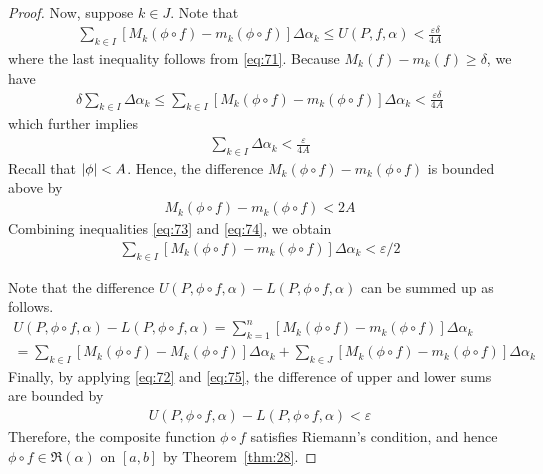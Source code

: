 \documentclass[thmcnt=section, 12pt]{my-elegantbook}
\begin{document}
\begin{proof}
    Now, suppose $k \in J$. Note that 
    \begin{align*}
        \sum_{k \in I} \left[ M_k(\phi \circ f) - m_k(\phi \circ f) \right] \Delta \alpha_k
        \leq U(P,f,\alpha)
        < \frac{\varepsilon \delta}{4 A}
    \end{align*}
    where the last inequality follows from \eqref{eq:71}. Because $M_k(f) - m_k(f) \geq \delta$, we have 
    \begin{align*}
        \delta \sum_{k \in I} \Delta \alpha_k
        \leq \sum_{k \in I} \left[ M_k(\phi \circ f) - m_k(\phi \circ f) \right] \Delta \alpha_k
        < \frac{\varepsilon \delta}{4 A}
    \end{align*}
    which further implies
    \begin{align}
        \sum_{k \in I} \Delta \alpha_k
        < \frac{\varepsilon}{4 A}
        \label{eq:73}
    \end{align}
    Recall that $\left\lvert \phi \right\rvert < A$. Hence, the difference $M_k(\phi \circ f) - m_k(\phi \circ f)$ is bounded above by 
    \begin{align}
        M_k(\phi \circ f) - m_k(\phi \circ f)
        < 2A
        \label{eq:74}
    \end{align}
    Combining inequalities \eqref{eq:73} and \eqref{eq:74}, we obtain 
    \begin{align}
        \sum_{k \in I} \left[ M_k(\phi \circ f) - m_k(\phi \circ f) \right] \Delta \alpha_k
        < \varepsilon / 2
        \label{eq:75}
    \end{align}

    Note that the difference $U(P,\phi \circ f, \alpha) - L(P,\phi \circ f, \alpha)$ can be summed up as follows.
    \begin{multline*}
        U(P,\phi \circ f, \alpha) - L(P,\phi \circ f, \alpha)
        = \sum_{k=1}^n \left[ M_k(\phi \circ f) - m_k(\phi \circ f) \right] \Delta \alpha_k \\ 
        = \sum_{k \in I} \left[ M_k(\phi \circ f) - M_k(\phi \circ f) \right] \Delta \alpha_k
        + \sum_{k \in J} \left[ M_k(\phi \circ f) - m_k(\phi \circ f) \right] \Delta \alpha_k
    \end{multline*}
    Finally, by applying \eqref{eq:72} and \eqref{eq:75}, the difference of upper and lower sums are bounded by 
    \begin{align*}
        U(P,\phi \circ f, \alpha) - L(P,\phi \circ f, \alpha) < \varepsilon
    \end{align*}
    Therefore, the composite function $\phi \circ f$ satisfies Riemann's condition, and hence $\phi \circ f \in \mathfrak{R}(\alpha)$ on $[a, b]$ by Theorem~\ref{thm:28}.
\end{proof}
\end{document}
